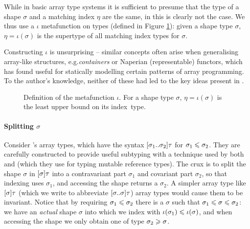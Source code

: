 While in basic array type systems it is sufficient to presume that the type of a shape $\sigma$ and a matching index $\eta$ are the same, in \starr{} this is clearly not the case. We thus use a $\iota$ metafunction on types (defined in Figure \ref{fig:iota}): given a shape type $\sigma$, $\eta = \iota(\sigma)$ is the supertype of all matching index types for $\sigma$.

Constructing $\iota$ is unsurprising -- similar concepts often arise when generalising array-like structures, e.g.\@ \textit{containers} \cite{containers} or Naperian (representable) functors, which \textcite{naperian-apl} has found useful for statically modelling certain patterns of array programming. To the author's knowledge, neither of these had led to the key ideas present in \starr{}.

\begin{figure}
    \centering
    
    \caption{Definition of the metafunction $\iota$. For a shape type $\sigma$, $\eta = \iota(\sigma)$ is the least upper bound on its index~type.}
    \label{fig:iota}
\end{figure}

\paragraph{Splitting $\sigma$} Consider \starr{}'s array types, which have the syntax $\sarraytype{\sigma_1}{\sigma_2}{\tau}$ for $\sigma_1 \leqslant \sigma_2$. They are carefully constructed to provide useful subtyping with a technique used by both \textcite{dolan-thesis} and \textcite{pottier-thesis} (which they use for typing mutable reference types). The crux is to split the shape $\sigma$ in $\sonebound{\sigma}\tau$ into a contravariant part $\sigma_1$ and covariant part $\sigma_2$, so that indexing uses $\sigma_1$, and accessing the shape returns a $\sigma_2$. A simpler array type like $\sonebound{\sigma}\tau$ (which we write to abbreviate $\sarraytype{\sigma}{\sigma}{\tau}$) array types would cause them to be invariant. Notice that by requiring $\sigma_1 \leqslant \sigma_2$ there is a $\sigma$ such that $\sigma_1 \leqslant \sigma \leqslant \sigma_2$: we have an \emph{actual} shape $\sigma$ into which we index with $\iota(\sigma_1) \leqslant \iota(\sigma)$, and when accessing the shape we only obtain one of type $\sigma_2 \geqslant \sigma$.

